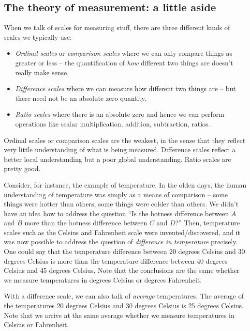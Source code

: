 \documentclass[10pt]{amsart}
\begin{document}
\subsection{The theory of measurement: a little aside}

When we talk of scales for measuring stuff, there are three different
kinds of scales we typically use:

\begin{itemize}
\item {\em Ordinal scales} or {\em comparison scales} where we can
  only compare things as greater or less -- the quantification of {\em
  how} different two things are doesn't really make sense.
\item {\em Difference scales} where we can measure how different two
  things are -- but there need not be an absolute zero quantity.
\item {\em Ratio scales} where there is an absolute zero and hence we
  can perform operations like scalar multiplication, addition,
  subtraction, ratios.
\end{itemize}

Ordinal scales or comparison scales are the weakest, in the sense that
they reflect very little understanding of what is being
measured. Difference scales reflect a better local understanding but a
poor global understanding. Ratio scales are pretty good.

Consider, for instance, the example of temperature. In the olden days,
the human understanding of temperature was simply as a means of
comparison -- some things were hotter than others, some things were
colder than others. We didn't have an idea how to address the question
``Is the hotness difference between $A$ and $B$ more than the hotness
difference between $C$ and $D$?'' Then, temperature scales such as the
Celsius and Fahrenheit scale were invented/discovered, and it was now
possible to address the question of {\em difference in temperature}
precisely. One could say that the temperature difference between 20
degrees Celsius and 30 degrees Celsius is more than the temperature
difference between 40 degrees Celsius and 45 degrees Celsius. Note
that the conclusions are the same whether we measure temperatures in
degrees Celsius or degrees Fahrenheit.

With a difference scale, we can also talk of {\em average}
temperatures. The average of the temperatures 20 degrees Celsius and
30 degrees Celsius is 25 degrees Celsius. Note that we arrive at the
same average whether we measure temperatures in Celsius or Fahrenheit.
\end{document}
